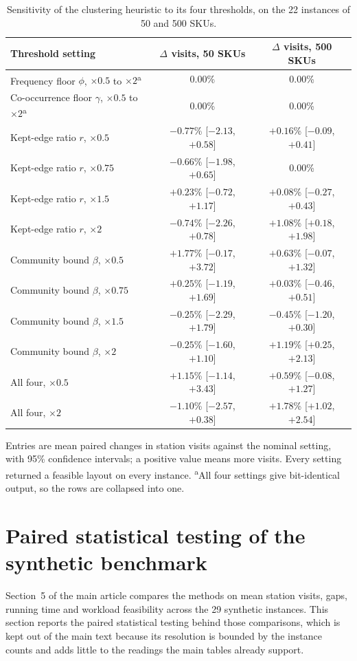 \documentclass[11pt]{article}
\newcommand{\tbl}[1]{\caption{#1}}
\newcommand{\tabnote}[1]{\vspace{2pt}\footnotesize\raggedright #1\par}
\begin{document}
\begin{table}[H]
\centering
\tbl{Sensitivity of the clustering heuristic to its four thresholds, on the 22 instances of 50 and 500 SKUs.}
{\small\setlength{\tabcolsep}{4pt}\begin{tabularx}{\textwidth}{@{}X c c@{}}
\toprule
Threshold setting & $\Delta$ visits, 50 SKUs & $\Delta$ visits, 500 SKUs \\
\midrule
Frequency floor $\phi$, $\times0.5$ to $\times2$\textsuperscript{a}     & $0.00$\% & $0.00$\% \\
Co-occurrence floor $\gamma$, $\times0.5$ to $\times2$\textsuperscript{a} & $0.00$\% & $0.00$\% \\
\midrule
Kept-edge ratio $r$, $\times0.5$   & $-0.77$\% [$-2.13$, $+0.58$] & $+0.16$\% [$-0.09$, $+0.41$] \\
Kept-edge ratio $r$, $\times0.75$  & $-0.66$\% [$-1.98$, $+0.65$] & $0.00$\% \\
Kept-edge ratio $r$, $\times1.5$   & $+0.23$\% [$-0.72$, $+1.17$] & $+0.08$\% [$-0.27$, $+0.43$] \\
Kept-edge ratio $r$, $\times2$     & $-0.74$\% [$-2.26$, $+0.78$] & $+1.08$\% [$+0.18$, $+1.98$] \\
\midrule
Community bound $\beta$, $\times0.5$  & $+1.77$\% [$-0.17$, $+3.72$] & $+0.63$\% [$-0.07$, $+1.32$] \\
Community bound $\beta$, $\times0.75$ & $+0.25$\% [$-1.19$, $+1.69$] & $+0.03$\% [$-0.46$, $+0.51$] \\
Community bound $\beta$, $\times1.5$  & $-0.25$\% [$-2.29$, $+1.79$] & $-0.45$\% [$-1.20$, $+0.30$] \\
Community bound $\beta$, $\times2$    & $-0.25$\% [$-1.60$, $+1.10$] & $+1.19$\% [$+0.25$, $+2.13$] \\
\midrule
All four, $\times0.5$ & $+1.15$\% [$-1.14$, $+3.43$] & $+0.59$\% [$-0.08$, $+1.27$] \\
All four, $\times2$   & $-1.10$\% [$-2.57$, $+0.38$] & $+1.78$\% [$+1.02$, $+2.54$] \\
\bottomrule
\end{tabularx}}
\tabnote{Entries are mean paired changes in station visits against the nominal setting, with 95\% confidence intervals; a positive value means more visits. Every setting returned a feasible layout on every instance. \textsuperscript{a}All four settings give bit-identical output, so the rows are collapsed into one.}
\label{tab:sensitivity}
\end{table}

\section{Paired statistical testing of the synthetic benchmark}\label{sup:tests}
Section~5 of the main article compares the methods on mean station visits, gaps, running time
and workload feasibility across the 29 synthetic instances. This section reports the paired
statistical testing behind those comparisons, which is kept out of the main text because its
resolution is bounded by the instance counts and adds little to the readings the main tables
already support.
\end{document}
